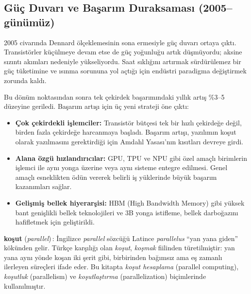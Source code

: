 \subsection{Güç Duvarı ve Başarım Duraksaması (2005--günümüz)}
\label{subsec:guc-duvari-basarim}

2005 civarında Dennard ölçeklemesinin sona ermesiyle güç duvarı ortaya çıktı. Transistörler küçülmeye devam etse de güç yoğunluğu artık düşmüyordu; aksine sızıntı akımları nedeniyle yükseliyordu. Saat sıklığını artırmak sürdürülemez bir güç tüketimine ve ısınma sorununa yol açtığı için endüstri paradigma değiştirmek zorunda kaldı.

Bu dönüm noktasından sonra tek çekirdek başarımındaki yıllık artış \%3--5 düzeyine geriledi. Başarım artışı için üç yeni strateji öne çıktı:

\begin{itemize}
    \item \textbf{Çok çekirdekli işlemciler:} Transistör bütçesi tek bir hızlı çekirdeğe değil, birden fazla çekirdeğe harcanmaya başladı. Başarım artışı, yazılımın koşut olarak yazılmasını gerektirdiği için Amdahl Yasası'nın kısıtları devreye girdi.

    \item \textbf{Alana özgü hızlandırıcılar:} GPU, TPU ve NPU gibi özel amaçlı birimlerin işlemci ile aynı yonga üzerine veya aynı sisteme entegre edilmesi. Genel amaçlı esneklikten ödün vererek belirli iş yüklerinde büyük başarım kazanımları sağlar.

    \item \textbf{Gelişmiş bellek hiyerarşisi:} HBM (High Bandwidth Memory) gibi yüksek bant genişlikli bellek teknolojileri ve 3B yonga istifleme, bellek darboğazını hafifletmek için geliştirildi.
\end{itemize}

\begin{terimnotu}
\textbf{koşut} (\emph{parallel})\,: İngilizce \emph{parallel} sözcüğü Latince \emph{parallelus} ``yan yana giden'' kökünden gelir. Türkçe karşılığı olan \emph{koşut}, \emph{koşmak} fiilinden türetilmiştir: yan yana aynı yönde koşan iki şerit gibi, birbirinden bağımsız ama eş zamanlı ilerleyen süreçleri ifade eder. Bu kitapta \emph{koşut hesaplama} (parallel computing), \emph{koşutluk} (parallelism) ve \emph{koşutlaştırma} (parallelization) biçimlerinde kullanılmıştır.
\end{terimnotu}

